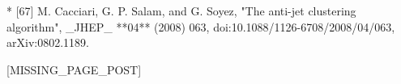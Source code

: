 * [67] M. Cacciari, G. P. Salam, and G. Soyez, "The anti-jet clustering algorithm", _JHEP_ **04** (2008) 063, doi:10.1088/1126-6708/2008/04/063, arXiv:0802.1189.

[MISSING_PAGE_POST]

 
